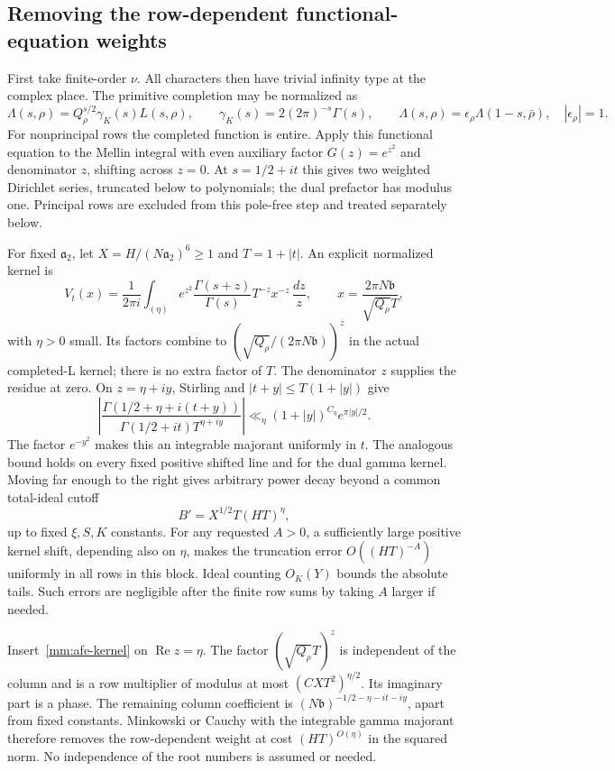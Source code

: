 \documentclass[11pt]{article}
\theoremstyle{definition}\newtheorem{definition}[theorem]{Definition}
\theoremstyle{remark}\newtheorem{remark}[theorem]{Remark}
\begin{document}
\subsection{Removing the row-dependent functional-equation weights}
First take finite-order $\nu$. All characters then have trivial infinity
type at the complex place. The primitive completion may be normalized as
\[
 \Lambda(s,\rho)=Q_\rho^{s/2}\gamma_K(s)L(s,\rho),\qquad
 \gamma_K(s)=2(2\pi)^{-s}\Gamma(s),\qquad
 \Lambda(s,\rho)=\epsilon_\rho\Lambda(1-s,\bar\rho),
 \quad |\epsilon_\rho|=1.
\]
For nonprincipal rows the completed function is entire. Apply this
functional equation to the Mellin integral with even auxiliary factor
$G(z)=e^{z^2}$ and denominator $z$, shifting across $z=0$. At
$s=1/2+it$ this gives two weighted Dirichlet series, truncated below to
polynomials; the dual prefactor has modulus one. Principal rows are excluded from
this pole-free step and treated separately below.

For fixed $\mathfrak a_2$, let $X=H/(N\mathfrak a_2)^6\ge1$ and
$T=1+|t|$. An explicit normalized kernel is
\begin{equation}\label{mm:afe-kernel}
 V_t(x)=\frac1{2\pi i}\int_{(\eta)}
 e^{z^2}\frac{\Gamma(s+z)}{\Gamma(s)}T^{-z}x^{-z}\,\frac{dz}{z},
 \qquad x=\frac{2\pi N\mathfrak b}{\sqrt{Q_\rho}T},
\end{equation}
with $\eta>0$ small. Its factors combine to
$(\sqrt{Q_\rho}/(2\pi N\mathfrak b))^z$ in the actual completed-L
kernel; there is no extra factor of $T$. The denominator $z$ supplies
the residue at zero.
On $z=\eta+iy$, Stirling and $|t+y|\le T(1+|y|)$ give
\[
 \left|\frac{\Gamma(1/2+\eta+i(t+y))}
                 {\Gamma(1/2+it)T^{\eta+iy}}\right|
 \ll_\eta (1+|y|)^{C_\eta}e^{\pi|y|/2}.
\]
The factor $e^{-y^2}$ makes this an integrable majorant uniformly in
$t$. The analogous bound holds on every fixed positive shifted line
and for the dual gamma kernel. Moving far enough to the right gives
arbitrary power decay beyond a common total-ideal cutoff
\begin{equation}\label{mm:common-cutoff}
 B'=X^{1/2}T(HT)^\eta,
\end{equation}
up to fixed $\xi,S,K$ constants. For any requested $A>0$, a sufficiently
large positive kernel shift, depending also on $\eta$, makes the
truncation error $O((HT)^{-A})$ uniformly in all rows in this block.
Ideal counting $O_K(Y)$ bounds the absolute tails. Such errors are
negligible after the finite row sums by taking $A$ larger if needed.

Insert~\eqref{mm:afe-kernel} on $\operatorname{Re}z=\eta$.
The factor $(\sqrt{Q_\rho}T)^z$ is independent of the column and is a
row multiplier of modulus at most $(CXT^2)^{\eta/2}$.
Its imaginary part is a phase. The remaining column coefficient is
$(N\mathfrak b)^{-1/2-\eta-it-iy}$, apart from fixed constants.
Minkowski or Cauchy with the integrable gamma majorant therefore removes
the row-dependent weight at cost $(HT)^{O(\eta)}$ in the squared norm.
No independence of the root numbers is assumed or needed.
\end{document}
